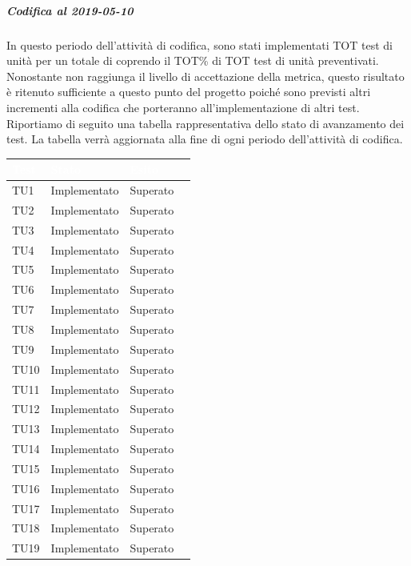 \subparagraph{Codifica al 2019-05-10}
In questo periodo dell'attività di codifica, sono stati implementati TOT test di unità per un totale di  coprendo il TOT\% di TOT test di unità preventivati.
Nonostante non raggiunga il livello di accettazione della
metrica, questo risultato è ritenuto sufficiente a questo punto del progetto poiché sono previsti altri incrementi alla codifica che porteranno all'implementazione di altri test.
\\Riportiamo di seguito una tabella rappresentativa dello stato di avanzamento dei test. La tabella verrà aggiornata alla fine di ogni periodo dell'attività di codifica.

\begin{longtable}{|>{\centering\arraybackslash}m{1.6cm}|>{\centering\arraybackslash}m{6.41cm}|>{\centering\arraybackslash}m{3.1cm}| c |}		
	\rowcolor{LightBlue}
	\textbf{\textcolor{white}{Test}}
	& \textbf{\textcolor{white}{Stato}}
	& \textbf{\textcolor{white}{Esito}}\\
	\hline
	TU1 & Implementato & Superato \\ \hline
	TU2 & Implementato & Superato  \\ \hline
	TU3 & Implementato & Superato  \\ \hline
	TU4 & Implementato & Superato  \\ \hline
	TU5 & Implementato & Superato  \\ \hline
	TU6 & Implementato & Superato  \\ \hline
	TU7 & Implementato & Superato  \\ \hline
	TU8 & Implementato & Superato  \\ \hline
	TU9 & Implementato & Superato  \\ \hline
	TU10 & Implementato & Superato  \\ \hline
	TU11 & Implementato & Superato  \\ \hline		
	TU12 & Implementato & Superato  \\ \hline
	TU13 & Implementato & Superato  \\ \hline
	TU14 & Implementato & Superato \\ \hline
	TU15 & Implementato & Superato  \\ \hline
	TU16 & Implementato & Superato \\ \hline
	TU17 & Implementato & Superato \\ \hline
	TU18 & Implementato & Superato \\ \hline
	TU19 & Implementato & Superato \\ \hline

\end{longtable}
